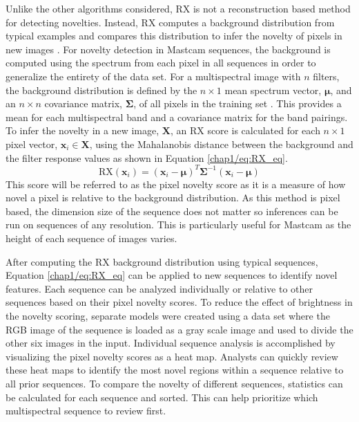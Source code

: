 Unlike the other algorithms considered, RX is not a reconstruction based method for detecting novelties.
Instead, RX computes a background distribution from typical examples and compares this distribution to infer the novelty of pixels in new images \cite{reed1990adaptive}.
For novelty detection in Mastcam sequences, the background is computed using the spectrum from each pixel in all sequences in order to generalize the entirety of the data set. 
For a multispectral image with $n$ filters, the background distribution is defined by the $n \times 1$ mean spectrum vector, $\boldsymbol{\mu}$, and an $n \times n$ covariance matrix, $\boldsymbol{\Sigma}$, of all pixels in the training set \cite{guo2016anomaly}.
This provides a mean for each multispectral band and a covariance matrix for the band pairings. 
To infer the novelty in a new image, $\boldsymbol{X}$, an RX score is calculated for each $n \times 1$ pixel vector, $\boldsymbol{x}_i \in \boldsymbol{X}$, using the Mahalanobis distance between the background and the filter response values as shown in Equation \ref{chap1/eq:RX_eq}.
\begin{equation}
    \label{chap1/eq:RX_eq}
    \text{RX}(\boldsymbol{x}_i) = (\boldsymbol{x}_i - \boldsymbol{\mu})^T \boldsymbol{\Sigma}^{-1} (\boldsymbol{x}_i - \boldsymbol{\mu})
\end{equation}
This score will be referred to as the pixel novelty score as it is a measure of how novel a pixel is relative to the background distribution. 
As this method is pixel based, the dimension size of the sequence does not matter so inferences can be run on sequences of any resolution.
This is particularly useful for Mastcam as the height of each sequence of images varies. 

After computing the RX background distribution using typical sequences, Equation \ref{chap1/eq:RX_eq} can be applied to new sequences to identify novel features.
Each sequence can be analyzed individually or relative to other sequences based on their pixel novelty scores. 
To reduce the effect of brightness in the novelty scoring, separate models were created using a data set where the RGB image of the sequence is loaded as a gray scale image and used to divide the other six images in the input. 
Individual sequence analysis is accomplished by visualizing the pixel novelty scores as a heat map. 
Analysts can quickly review these heat maps to identify the most novel regions within a sequence relative to all prior sequences. 
To compare the novelty of different sequences, statistics can be calculated for each sequence and sorted.
This can help prioritize which multispectral sequence to review first. 
